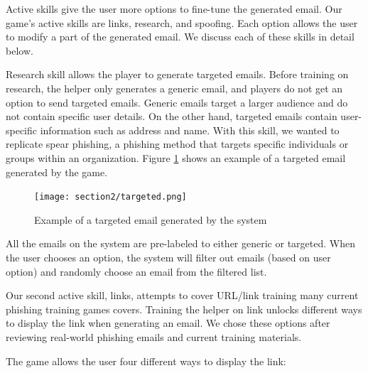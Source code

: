 Active skills give the user more options to fine-tune the generated email. Our game's active skills are links, research, and spoofing. Each option allows the user to modify a part of the generated email. We discuss each of these skills in detail below.

Research skill allows the player to generate targeted emails. Before training on research, the helper only generates a generic email, and players do not get an option to send targeted emails. Generic emails target a larger audience and do not contain specific user details. On the other hand, targeted emails contain user-specific information such as address and name. With this skill, we wanted to replicate spear phishing, a phishing method that targets specific individuals or groups within an organization. Figure \ref{fig:targeted} shows an example of a targeted email generated by the game.

\begin{figure}[ht]
    \centering
    \texttt{[image: section2/targeted.png]}
    \caption{Example of a targeted email generated by the system}
    \label{fig:targeted}
\end{figure}

All the emails on the system are pre-labeled to either generic or targeted. When the user chooses an option, the system will filter out emails (based on user option) and randomly choose an email from the filtered list.

Our second active skill, links, attempts to cover URL/link training many current phishing training games covers. Training the helper on link unlocks different ways to display the link when generating an email. We chose these options after reviewing real-world phishing emails and current training materials.

The game allows the user four different ways to display the link:

